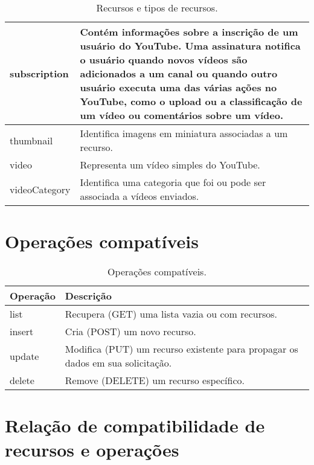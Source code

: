 \begin{table}[ht]
\begin{tabular}{|p{3cm}|p{12cm}|}
subscription	&	Contém informações sobre a inscrição de um usuário do YouTube. Uma assinatura notifica o usuário quando novos vídeos são adicionados a um canal ou quando outro usuário executa uma das várias ações no YouTube, como o upload ou a classificação de um vídeo ou comentários sobre um vídeo.	\\ \hline
thumbnail	    &	Identifica imagens em miniatura associadas a um recurso.	\\ \hline
video	        &	Representa um vídeo simples do YouTube.	\\ \hline
videoCategory	&	Identifica uma categoria que foi ou pode ser associada a vídeos enviados.	\\ \hline
\end{tabular}
\caption[Recursos e tipos de recursos]{Recursos e tipos de recursos\cite{GettingStartedYoutubeAPI}.}
\label{fig: RecursosYoutube}
\end{table}

\section{Operações compatíveis}
\label{sec: OperacoesCompativeis}

\begin{table}[ht]
\begin{tabular}{|p{3cm}|p{12cm}|}
\hline
\rowcolor[HTML]{CFCFCF} 
Operação  &	Descrição	\\ \hline
list	  &	Recupera (GET) uma lista vazia ou com recursos.	\\ \hline
insert	  &	Cria (POST) um novo recurso.	\\ \hline
update	  &	Modifica (PUT) um recurso existente para propagar os dados em sua solicitação.	\\ \hline
delete	  &	Remove (DELETE) um recurso específico.	\\ \hline
\end{tabular}
\caption[Operações compatíveis]{Operações compatíveis\cite{GettingStartedYoutubeAPI}.}
\label{fig: OperacoesCompativeis}
\end{table}

\section{Relação de compatibilidade de recursos e operações}
\label{sec: OperacoesCompativeisComRecursos}

